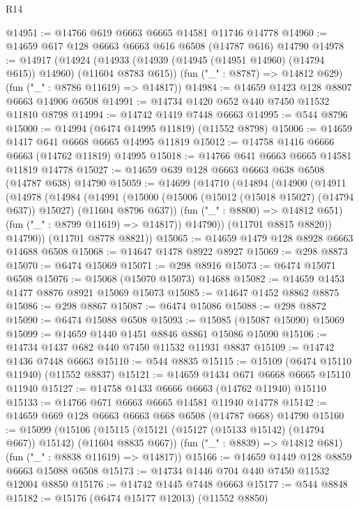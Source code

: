 \begin{lexlean}{R14}
\begin{coremodule}
{{{{{{{{{{{{{{{{{{{{{{{{{{{{{{{{{{{{{{{{{{{{{{{{{{{{{{{{{{{{{{{{{{{{{{{{{{{{{{{{{{@14951 := @14766 @619 @6663 @6665 @14581 @11746 @14778
@14960 := @14659 @617 @128 @6663 @6663 @616 @6508 (@14787 @616) @14790
@14978 := @14917
    (@14924
      (@14933 (@14939 (@14945 (@14951 @14960) (@14794 @615)) @14960) (@11604 @8783 @615))
      (fun ("_" : @8787) => @14812 @629)
      (fun ("_" : @8786 @11619) => @14817))
@14984 := @14659 @1423 @128 @8807 @6663 @14906 @6508
@14991 := @14734 @1420 @652 @440 @7450 @11532 @11810 @8798
@14994 := @14742 @1419 @7448 @6663
@14995 := @544 @8796
@15000 := @14994 (@6474 @14995 @11819) (@11552 @8798)
@15006 := @14659 @1417 @641 @6668 @6665 @14995 @11819
@15012 := @14758 @1416 @6666 @6663 (@14762 @11819) @14995
@15018 := @14766 @641 @6663 @6665 @14581 @11819 @14778
@15027 := @14659 @639 @128 @6663 @6663 @638 @6508 (@14787 @638) @14790
@15059 := @14699
    (@14710
      (@14894
        (@14900
          (@14911
            (@14978
              (@14984
                (@14991
                  (@15000
                    (@15006 (@15012 (@15018 @15027) (@14794 @637)) @15027)
                    (@11604 @8796 @637))
                  (fun ("_" : @8800) => @14812 @651)
                  (fun ("_" : @8799 @11619) => @14817))
                @14790))
            (@11701 @8815 @8820))
          @14790))
      (@11701 @8778 @8821))
@15065 := @14659 @1479 @128 @8928 @6663 @14688 @6508
@15068 := @14647 @1478 @8922 @8927
@15069 := @298 @8873
@15070 := @6474 @15069
@15071 := @298 @8916
@15073 := @6474 @15071 @6508
@15076 := @15068 (@15070 @15073) @14688
@15082 := @14659 @1453 @1477 @8876 @8921 @15069 @15073
@15085 := @14647 @1452 @8862 @8875
@15086 := @298 @8867
@15087 := @6474 @15086
@15088 := @298 @8872
@15090 := @6474 @15088 @6508
@15093 := @15085 (@15087 @15090) @15069
@15099 := @14659 @1440 @1451 @8846 @8861 @15086 @15090
@15106 := @14734 @1437 @682 @440 @7450 @11532 @11931 @8837
@15109 := @14742 @1436 @7448 @6663
@15110 := @544 @8835
@15115 := @15109 (@6474 @15110 @11940) (@11552 @8837)
@15121 := @14659 @1434 @671 @6668 @6665 @15110 @11940
@15127 := @14758 @1433 @6666 @6663 (@14762 @11940) @15110
@15133 := @14766 @671 @6663 @6665 @14581 @11940 @14778
@15142 := @14659 @669 @128 @6663 @6663 @668 @6508 (@14787 @668) @14790
@15160 := @15099
    (@15106
      (@15115 (@15121 (@15127 (@15133 @15142) (@14794 @667)) @15142) (@11604 @8835 @667))
      (fun ("_" : @8839) => @14812 @681)
      (fun ("_" : @8838 @11619) => @14817))
@15166 := @14659 @1449 @128 @8859 @6663 @15088 @6508
@15173 := @14734 @1446 @704 @440 @7450 @11532 @12004 @8850
@15176 := @14742 @1445 @7448 @6663
@15177 := @544 @8848
@15182 := @15176 (@6474 @15177 @12013) (@11552 @8850)
}}}}}}}}}}}}}}}}}}}}}}}}}}}}}}}}}}}}}}}}}}}}}}}}}}}}}}}}}}}}}}}}}}}}}}}}}}}}}}}}}}
\end{coremodule}
\end{lexlean}
